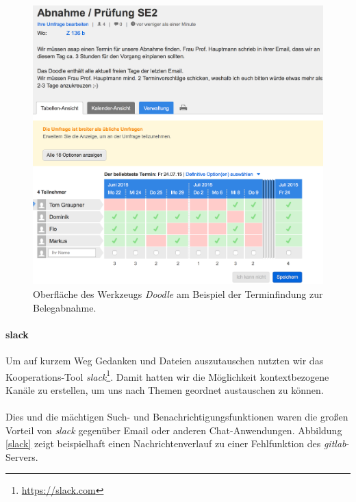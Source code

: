 \begin{figure}[h!]
	\centering
	\includegraphics[width=\textwidth]{images/doodle.png}
	\caption{Oberfläche des Werkzeugs \textit{Doodle} am Beispiel der Terminfindung zur Belegabnahme.}
	\label{doodle}
\end{figure}

\newpage
\hspace*{2cm}
\paragraph{slack}Um auf kurzem Weg Gedanken und Dateien auszutauschen nutzten wir das Kooperations-Tool \textit{slack}\footnote{\url{https://slack.com}}. Damit hatten wir die Möglichkeit kontextbezogene Kanäle zu erstellen, um uns nach Themen geordnet austauschen zu können. 

\paragraph{}Dies und die mächtigen Such- und Benachrichtigungsfunktionen waren die großen Vorteil von \textit{slack} gegenüber Email oder anderen Chat-Anwendungen. Abbildung \ref{slack} zeigt beispielhaft einen Nachrichtenverlauf zu einer Fehlfunktion des \textit{gitlab}-Servers.

